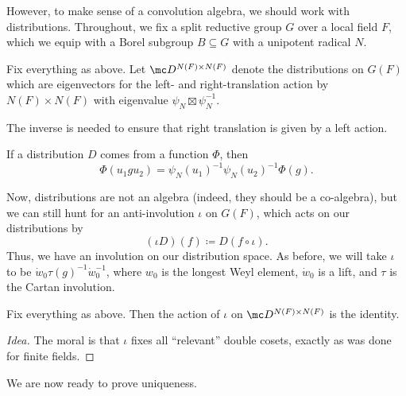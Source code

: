 \documentclass[../notes.tex]{subfiles}
\begin{document}
However, to make sense of a convolution algebra, we should work with distributions. Throughout, we fix a split reductive group $G$ over a local field $F$, which we equip with a Borel subgroup $B\subseteq G$ with a unipotent radical $N$.
\begin{notation}
	Fix everything as above. Let $\mc D^{N(F)\times N(F)}$ denote the distributions on $G(F)$ which are eigenvectors for the left- and right-translation action by $N(F)\times N(F)$ with eigenvalue $\psi_N\boxtimes\psi_N^{-1}$.
\end{notation}
\begin{remark}
	The inverse is needed to ensure that right translation is given by a left action.
\end{remark}
\begin{remark}
	If a distribution $D$ comes from a function $\Phi$, then
	\[\Phi(u_1gu_2)=\psi_N(u_1)^{-1}\psi_N(u_2)^{-1}\Phi(g).\]
\end{remark}
Now, distributions are not an algebra (indeed, they should be a co-algebra), but we can still hunt for an anti-involution $\iota$ on $G(F)$, which acts on our distributions by
\[(\iota D)(f)\coloneqq D(f\circ\iota).\]
Thus, we have an involution on our distribution space. As before, we will take $\iota$ to be $\dot w_0\tau(g)^{-1}\dot w_0^{-1}$, where $w_0$ is the longest Weyl element, $\dot w_0$ is a lift, and $\tau$ is the Cartan involution.
\begin{proposition} \label{prop:distribution-fixed}
	Fix everything as above. Then the action of $\iota$ on $\mc D^{N(F)\times N(F)}$ is the identity.
\end{proposition}
\begin{proof}[Idea]
	The moral is that $\iota$ fixes all ``relevant'' double cosets, exactly as was done for finite fields.
\end{proof}
We are now ready to prove uniqueness.
\end{document}
